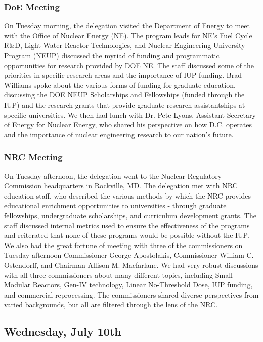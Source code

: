 \subsubsection*{DoE Meeting}

On Tuesday morning, the delegation visited the Department of Energy to meet with
the Office of Nuclear Energy (NE). The program leads for NE’s Fuel Cycle R\&D,
Light Water Reactor Technologies, and Nuclear Engineering University Program
(NEUP) discussed the myriad of funding and programmatic opportunities for
research provided by DOE NE. The staff discussed some of the priorities in
specific research areas and the importance of IUP funding. Brad Williams spoke
about the various forms of funding for graduate education, discussing the DOE
NEUP Scholarships and Fellowships (funded through the IUP) and the research
grants that provide graduate research assistantships at specific
universities. We then had lunch with Dr. Pete Lyons, Assistant Secretary of
Energy for Nuclear Energy, who shared his perspective on how D.C. operates and
the importance of nuclear engineering research to our nation's future.

\subsubsection*{NRC Meeting}

On Tuesday afternoon, the delegation went to the Nuclear Regulatory Commission
headquarters in Rockville, MD. The delegation met with NRC education staff, who
described the various methods by which the NRC provides educational enrichment
opportunities to universities - through graduate fellowships, undergraduate
scholarships, and curriculum development grants. The staff discussed internal
metrics used to ensure the effectiveness of the programs and reiterated that
none of these programs would be possible without the IUP. We also had the great
fortune of meeting with three of the commissioners on Tuesday afternoon
Commissioner George Apostolakis, Commissioner William C. Ostendorff, and
Chairman Allison M. Macfarlane. We had very robust discussions with all three
commissioners about many different topics, including Small Modular Reactors,
Gen-IV technology, Linear No-Threshold Dose, IUP funding, and commercial
reprocessing. The commissioners shared diverse perspectives from varied
backgrounds, but all are filtered through the lens of the NRC.

\subsection*{Wednesday, July 10th}

